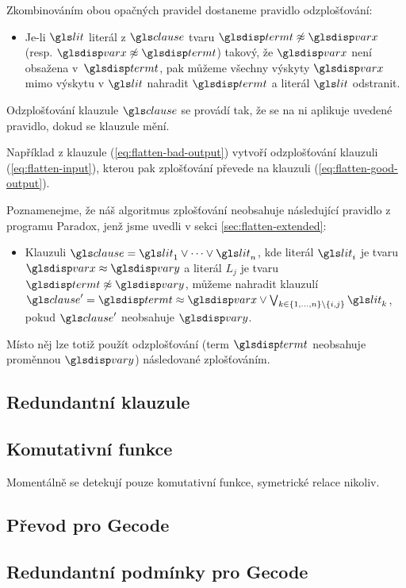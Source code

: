 Zkombinováním obou opačných pravidel dostaneme pravidlo odzplošťování:
\begin{itemize}
\item Je-li $\lit$ literál z $\clause$ tvaru $\term \not\approx \var$
  (resp. $\var \not\approx \term$) takový, že $\var$ není obsažena
  v~$\term$, pak můžeme všechny výskyty $\var$ mimo výskytu
  v $\lit$ nahradit $\term$
  a literál $\lit$ odstranit.
\end{itemize}
Odzplošťování klauzule $\clause$ se provádí tak,
že se na ni aplikuje uvedené pravidlo, dokud se klauzule mění.

Například z klauzule (\ref{eq:flatten-bad-output})
vytvoří odzplošťování klauzuli (\ref{eq:flatten-input}),
kterou pak zplošťování převede na klauzuli (\ref{eq:flatten-good-output}).

Poznamenejme, že náš algoritmus zplošťování neobsahuje následující pravidlo
z programu Paradox, jenž jsme uvedli v sekci \ref{sec:flatten-extended}:
\begin{itemize}
\item Klauzuli $\clause = \lit_1 \vee \cdots \vee \lit_n$, kde literál
  $\lit_i$ je tvaru $\var \approx \varY$ a literál $L_j$ je tvaru
  $\term \not\approx \varY$, můžeme nahradit klauzulí
  $\clause' = \term \approx \var \vee
  \bigvee_{k \in \{ 1 \comdots n \} \setminus \{ i, j \}} \lit_k$, pokud $\clause'$
  neobsahuje $\varY$.
\end{itemize}
Místo něj lze totiž použít odzplošťování (term $\term$ neobsahuje
proměnnou $\varY$) ná\-sle\-do\-va\-né zplošťováním.

\subsection{Redundantní klauzule}

\subsection{Komutativní funkce}

Momentálně se detekují pouze komutativní funkce, symetrické relace nikoliv.

\subsection{Převod pro Gecode}

\subsection{Redundantní podmínky pro Gecode}

